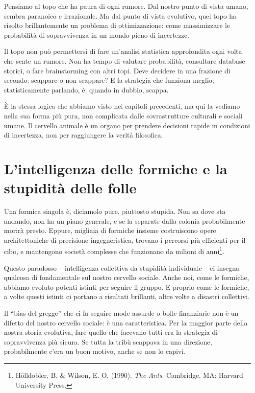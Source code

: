 Pensiamo al topo che ha paura di ogni rumore. Dal nostro punto di vista umano, sembra paranoico e irrazionale. Ma dal punto di vista evolutivo, quel topo ha risolto brillantemente un problema di ottimizzazione: come massimizzare le probabilità di sopravvivenza in un mondo pieno di incertezze.

Il topo non può permettersi di fare un'analisi statistica approfondita ogni volta che sente un rumore. Non ha tempo di valutare probabilità, consultare database storici, o fare brainstorming con altri topi. Deve decidere in una frazione di secondo: scappare o non scappare? E la strategia che funziona meglio, statisticamente parlando, è: quando in dubbio, scappa.

È la stessa logica che abbiamo visto nei capitoli precedenti, ma qui la vediamo nella sua forma più pura, non complicata dalle sovrastrutture culturali e sociali umane. Il cervello animale è un organo per prendere decisioni rapide in condizioni di incertezza, non per raggiungere la verità filosofica.

\section{L'intelligenza delle formiche e la stupidità delle folle}

Una formica singola è, diciamolo pure, piuttosto stupida. Non sa dove sta andando, non ha un piano generale, e se la separate dalla colonia probabilmente morirà presto. Eppure, migliaia di formiche insieme costruiscono opere architettoniche di precisione ingegneristica, trovano i percorsi più efficienti per il cibo, e mantengono società complesse che funzionano da milioni di anni\footnote{Hölldobler, B. \& Wilson, E. O. (1990). \emph{The Ants}. Cambridge, MA: Harvard University Press.}.

Questo paradosso -- intelligenza collettiva da stupidità individuale -- ci insegna qualcosa di fondamentale sul nostro cervello sociale. Anche noi, come le formiche, abbiamo evoluto potenti istinti per seguire il gruppo. E proprio come le formiche, a volte questi istinti ci portano a risultati brillanti, altre volte a disastri collettivi.

Il ``bias del gregge'' che ci fa seguire mode assurde o bolle finanziarie non è un difetto del nostro cervello sociale: è una caratteristica. Per la maggior parte della nostra storia evolutiva, fare quello che facevano tutti era la strategia di sopravvivenza più sicura. Se tutta la tribù scappava in una direzione, probabilmente c'era un buon motivo, anche se non lo capivi.

